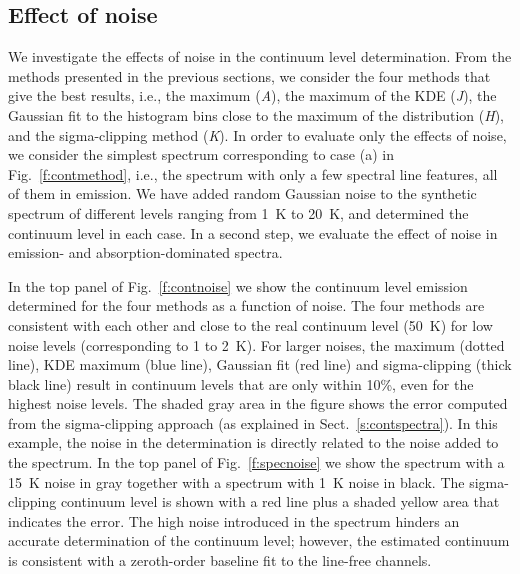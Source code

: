 \documentclass{aa}
\begin{document}
\subsection{Effect of noise}\label{s:contnoise}

We investigate the effects of noise in the continuum level determination. From the methods presented in the previous sections, we consider the four methods that give the best results, i.e., the maximum (\textit{A}), the maximum of the KDE (\textit{J}), the Gaussian fit to the histogram bins close to the maximum of the distribution (\textit{H}), and the sigma-clipping method (\textit{K}). In order to evaluate only the effects of noise, we consider the simplest spectrum corresponding to case (a) in Fig.~\ref{f:contmethod}, i.e., the spectrum with only a few spectral line features, all of them in emission. We have added random Gaussian noise to the synthetic spectrum of different levels ranging from 1~K to 20~K, and determined the continuum level in each case. In a second step, we evaluate the effect of noise in emission- and absorption-dominated spectra.

In the top panel of Fig.~\ref{f:contnoise} we show the continuum level emission determined for the four methods as a function of noise. The four methods are consistent with each other and close to the real continuum level (50~K) for low noise levels (corresponding to 1 to 2~K). For larger noises, the maximum (dotted line), KDE maximum (blue line), Gaussian fit (red line) and sigma-clipping (thick black line) result in continuum levels that are only within 10\%, even for the highest noise levels. The shaded gray area in the figure shows the error computed from the sigma-clipping approach (as explained in Sect.~\ref{s:contspectra}). In this example, the noise in the determination is directly related to the noise added to the spectrum. In the top panel of Fig.~\ref{f:specnoise} we show the spectrum with a 15~K noise in gray together with a spectrum with 1~K noise in black. The sigma-clipping continuum level is shown with a red line plus a shaded yellow area that indicates the error. The high noise introduced in the spectrum hinders an accurate determination of the continuum level; however, the estimated continuum is consistent with a zeroth-order baseline fit to the line-free channels.
\end{document}
